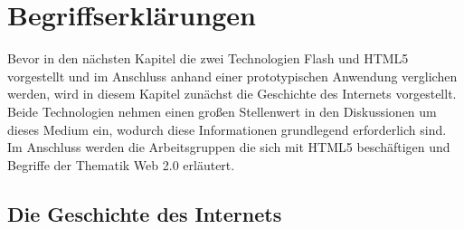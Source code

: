 \chapter{Begriffserklärungen}

Bevor in den nächsten Kapitel die zwei Technologien Flash und HTML5
vorgestellt und im Anschluss anhand einer prototypischen Anwendung
verglichen werden, wird in diesem Kapitel zunächst die Geschichte des
Internets vorgestellt. Beide Technologien nehmen einen großen Stellenwert
in den Diskussionen um dieses Medium ein, wodurch diese Informationen
grundlegend erforderlich sind. Im Anschluss werden die Arbeitsgruppen die
sich mit HTML5 beschäftigen und Begriffe der Thematik Web 2.0 erläutert.

\section{Die Geschichte des Internets}

